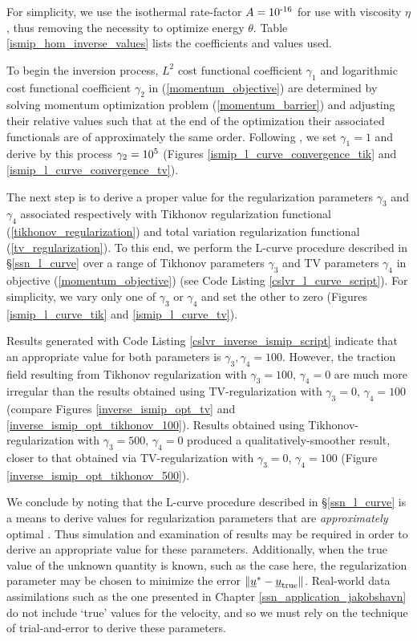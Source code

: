 For simplicity, we use the isothermal rate-factor $A = 10^{\textrm{-16}}$  for use with viscosity $\eta$, thus removing the necessity to optimize energy $\theta$.  Table \ref{ismip_hom_inverse_values} lists the coefficients and values used.

To begin the inversion process, $L^2$ cost functional coefficient $\gamma_1$ and logarithmic cost functional coefficient $\gamma_2$ in (\ref{momentum_objective}) are determined by solving momentum optimization problem (\ref{momentum_barrier}) and adjusting their relative values such that at the end of the optimization their associated functionals are of approximately the same order.  Following \citet{morlighem_2013}, we set $\gamma_1 = 1$ and derive by this process $\gamma_2 = 10^{\textrm{5}}$ (Figures \ref{ismip_l_curve_convergence_tik} and \ref{ismip_l_curve_convergence_tv}).

The next step is to derive a proper value for the regularization parameters $\gamma_3$ and $\gamma_4$ associated respectively with Tikhonov regularization functional (\ref{tikhonov_regularization}) and total variation regularization functional (\ref{tv_regularization}).  To this end, we perform the L-curve procedure described in \S \ref{ssn_l_curve} over a range of Tikhonov parameters $\gamma_3$ and TV parameters $\gamma_4$ in objective (\ref{momentum_objective}) (see Code Listing \ref{cslvr_l_curve_script}).  For simplicity, we vary only one of $\gamma_3$ or $\gamma_4$ and set the other to zero (Figures \ref{ismip_l_curve_tik} and \ref{ismip_l_curve_tv}).

Results generated with Code Listing \ref{cslvr_inverse_ismip_script} indicate that an appropriate value for both parameters is $\gamma_3, \gamma_4 = 100$.  However, the traction field resulting from Tikhonov regularization with $\gamma_3 = 100$, $\gamma_4=0$ are much more irregular than the results obtained using TV-regularization with $\gamma_3=0$, $\gamma_4=100$ (compare Figures \ref{inverse_ismip_opt_tv} and \ref{inverse_ismip_opt_tikhonov_100}).  Results obtained using Tikhonov-regularization with $\gamma_3=500$, $\gamma_4=0$ produced a qualitatively-smoother result, closer to that obtained via TV-regularization with $\gamma_3=0$, $\gamma_4=100$ (Figure \ref{inverse_ismip_opt_tikhonov_500}).

We conclude by noting that the L-curve procedure described in \S \ref{ssn_l_curve} is a means to derive values for regularization parameters that are \emph{approximately} optimal \citep{vogel_2002}.  Thus simulation and examination of results may be required in order to derive an appropriate value for these parameters.  Additionally, when the true value of the unknown quantity is known, such as the case here, the regularization parameter may be chosen to minimize the error $\Vert \underline{u}^* - \underline{u}_{\text{true}} \Vert$.  Real-world data assimilations such as the one presented in Chapter \ref{ssn_application_jakobshavn} do not include `true' values for the velocity, and so we must rely on the technique of trial-and-error to derive these parameters.

